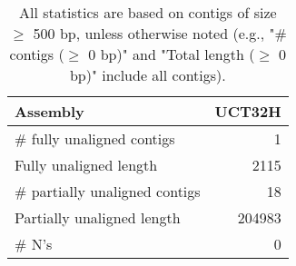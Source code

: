 \documentclass[12pt,a4paper]{article}
\begin{document}
\begin{table}[ht]
\begin{center}
\caption{All statistics are based on contigs of size $\geq$ 500 bp, unless otherwise noted (e.g., "\# contigs ($\geq$ 0 bp)" and "Total length ($\geq$ 0 bp)" include all contigs).}
\begin{tabular}{|l*{1}{|r}|}
\hline
Assembly & UCT32H \\ \hline
\# fully unaligned contigs & 1 \\ \hline
Fully unaligned length & 2115 \\ \hline
\# partially unaligned contigs & 18 \\ \hline
Partially unaligned length & 204983 \\ \hline
\# N's & 0 \\ \hline
\end{tabular}
\end{center}
\end{table}
\end{document}
